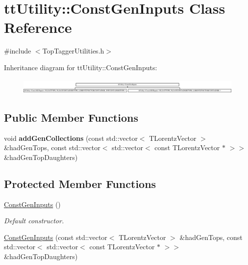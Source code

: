 \hypertarget{classttUtility_1_1ConstGenInputs}{\section{tt\-Utility\-:\-:Const\-Gen\-Inputs Class Reference}
\label{classttUtility_1_1ConstGenInputs}
}


{\ttfamily \#include $<$Top\-Tagger\-Utilities.\-h$>$}

Inheritance diagram for tt\-Utility\-:\-:Const\-Gen\-Inputs\-:\begin{figure}[H]
\begin{center}
\leavevmode
\includegraphics[height=0.773481cm]{classttUtility_1_1ConstGenInputs}
\end{center}
\end{figure}
\subsection*{Public Member Functions}
\begin{DoxyCompactItemize}
\item 
\hypertarget{classttUtility_1_1ConstGenInputs_a23ebb2cf29f12548cb40e7d535e62298}{void {\bfseries add\-Gen\-Collections} (const std\-::vector$<$ T\-Lorentz\-Vector $>$ \&had\-Gen\-Tops, const std\-::vector$<$ std\-::vector$<$ const T\-Lorentz\-Vector $\ast$ $>$$>$ \&had\-Gen\-Top\-Daughters)}\label{classttUtility_1_1ConstGenInputs_a23ebb2cf29f12548cb40e7d535e62298}

\end{DoxyCompactItemize}
\subsection*{Protected Member Functions}
\begin{DoxyCompactItemize}
\item 
\hypertarget{classttUtility_1_1ConstGenInputs_a520c5a594261d877f0fb4ad46aedc71e}{\hyperlink{classttUtility_1_1ConstGenInputs_a520c5a594261d877f0fb4ad46aedc71e}{Const\-Gen\-Inputs} ()}\label{classttUtility_1_1ConstGenInputs_a520c5a594261d877f0fb4ad46aedc71e}

\begin{DoxyCompactList}\small\item\em Default constructor. \end{DoxyCompactList}\item 
\hyperlink{classttUtility_1_1ConstGenInputs_a36cd5945c3febe03ded92e506d86e7c4}{Const\-Gen\-Inputs} (const std\-::vector$<$ T\-Lorentz\-Vector $>$ \&had\-Gen\-Tops, const std\-::vector$<$ std\-::vector$<$ const T\-Lorentz\-Vector $\ast$ $>$$>$ \&had\-Gen\-Top\-Daughters)
\end{DoxyCompactItemize}
